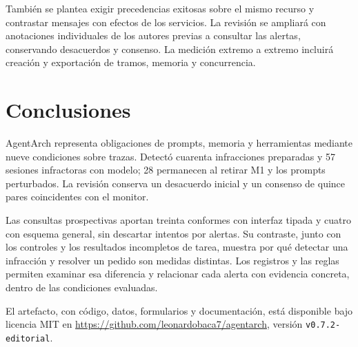 \documentclass[conference]{IEEEtran}
\begin{document}
También se plantea exigir precedencias exitosas sobre el mismo recurso y contrastar mensajes con efectos de los servicios. La revisión se ampliará con anotaciones individuales de los autores previas a consultar las alertas, conservando desacuerdos y consenso. La medición extremo a extremo incluirá creación y exportación de tramos, memoria y concurrencia.

\section{Conclusiones}
AgentArch representa obligaciones de prompts, memoria y herramientas mediante nueve condiciones sobre trazas. Detectó cuarenta infracciones preparadas y 57 sesiones infractoras con modelo; 28 permanecen al retirar M1 y los prompts perturbados. La revisión conserva un desacuerdo inicial y un consenso de quince pares coincidentes con el monitor.

Las consultas prospectivas aportan treinta conformes con interfaz tipada y cuatro con esquema general, sin descartar intentos por alertas. Su contraste, junto con los controles y los resultados incompletos de tarea, muestra por qué detectar una infracción y resolver un pedido son medidas distintas. Los registros y las reglas permiten examinar esa diferencia y relacionar cada alerta con evidencia concreta, dentro de las condiciones evaluadas.

El artefacto, con código, datos, formularios y documentación, está disponible bajo licencia MIT en \url{https://github.com/leonardobaca7/agentarch}, versión \texttt{v0.7.2-editorial}.


\end{document}
